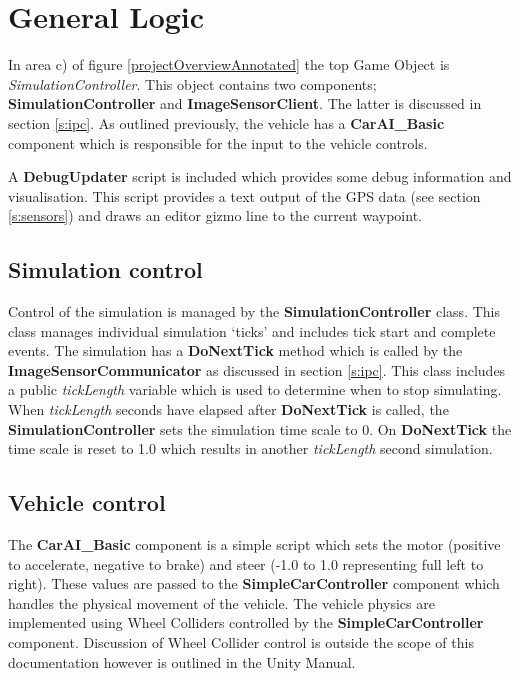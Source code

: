 \documentclass{article}
\begin{document}
\section{General Logic}

In area c) of figure \ref{projectOverviewAnnotated} the top Game Object is \textit{SimulationController}. This object contains two components; \textbf{SimulationController} and \textbf{ImageSensorClient}. The latter is discussed in section \ref{s:ipc}. As outlined previously, the vehicle has a \textbf{CarAI\_Basic} component which is responsible for the input to the vehicle controls.

A \textbf{DebugUpdater} script is included which provides some debug information and visualisation. This script provides a text output of the GPS data (see section \ref{s:sensors}) and draws an editor gizmo line to the current waypoint.

\subsection{Simulation control}

Control of the simulation is managed by the \textbf{SimulationController} class. This class manages individual simulation `ticks' and includes tick start and complete events. The simulation has a \textbf{DoNextTick} method which is called by the \textbf{ImageSensorCommunicator} as discussed in section \ref{s:ipc}. This class includes a public \textit{tickLength} variable which is used to determine when to stop simulating. When \textit{tickLength} seconds have elapsed after \textbf{DoNextTick} is called, the \textbf{SimulationController} sets the simulation time scale to 0. On \textbf{DoNextTick} the time scale is reset to 1.0 which results in another \textit{tickLength} second simulation.

\subsection{Vehicle control}

The \textbf{CarAI\_Basic} component is a simple script which sets the motor (positive to accelerate, negative to brake) and steer (-1.0 to 1.0 representing full left to right). These values are passed to the \textbf{SimpleCarController} component which handles the physical movement of the vehicle. The vehicle physics are implemented using Wheel Colliders controlled by the \textbf{SimpleCarController} component. Discussion of Wheel Collider control is outside the scope of this documentation however is outlined in the Unity Manual.
\end{document}
